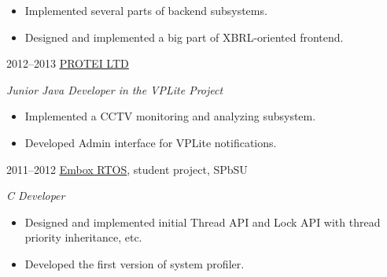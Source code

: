 \documentclass[]{friggeri-cv} %
\begin{document}
\begin{entrylist}
{    \begin{itemize}
    \item
        Implemented several parts of backend subsystems.
    \item
        Designed and implemented
        a big part of XBRL-oriented frontend.
    \end{itemize}
}
\entry
{2012--2013}
{\href{http://protei.com}{\underline{PROTEI LTD}}}
{}
{\emph{Junior Java Developer in the VPLite Project}
    \begin{itemize}
        \item
        Implemented a CCTV monitoring and analyzing subsystem.
        \item
        Developed Admin interface for VPLite notifications.
    \end{itemize}
}
\entry
{2011--2012}
{\href{https://code.google.com/p/embox}{\underline{Embox RTOS}}, student project, SPbSU}
{}
{\emph{C Developer}
    \begin{itemize}
        \item
        Designed and implemented initial Thread API and Lock API with thread priority inheritance, etc.
        \item
        Developed the first version of system profiler.
    \end{itemize}
}
\end{entrylist}

%

\end{document}
